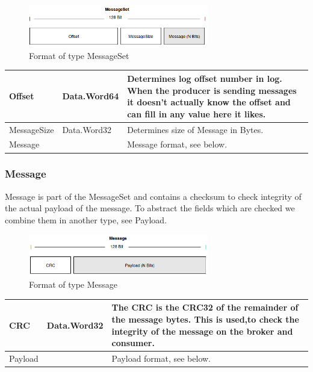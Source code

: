 \begin{figure}[H]
    \centering
    \includegraphics[width=0.7\textwidth]{images/impl-prot-types-messageSet.png}
    \caption{Format of type MessageSet}
    \label{fig:impl-prot-types-messageSet}
\end{figure}

\begin{table}[H]
\centering
\begin{tabular}{ l  l  p{11cm} }
\hline
Offset      & Data.Word64 & Determines log offset number in log.  When the producer is sending messages it doesn't actually know the offset and can fill in any value here it likes. \\ \hline
MessageSize & Data.Word32 & Determines size of Message in Bytes.               \\ \hline
Message     &     & Message format, see below.                                                                                                                    \\ \hline
\end{tabular}
\end{table}

\subsubsection{Message}
Message is part of the MessageSet and contains a checksum to check integrity of
the actual payload of the message. To abstract the fields which are checked we
combine them in another type, see Payload.

\begin{figure}[H]
    \centering
    \includegraphics[width=0.7\textwidth]{images/impl-prot-types-message.png}
    \caption{Format of type Message}
    \label{fig:impl-prot-types-message}
\end{figure}

\begin{table}[H]
\centering
\begin{tabular}{ l  l  p{11cm} }
\hline
CRC     & Data.Word32 & The CRC is the CRC32 of the remainder of the message bytes. This is used,to check the integrity of the message on the broker and consumer. \\ \hline
Payload &      & Payload format, see below.                                                                                                                  \\ \hline
\end{tabular}
\end{table}


